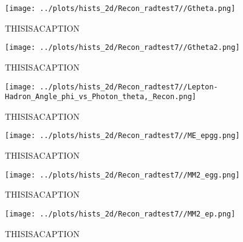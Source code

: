 \documentclass{article}
\begin{document}
\begin{landscape}
    \begin{figure}[ht]
        \centering

        \texttt{[image: ../plots/hists\_2d/Recon\_radtest7//Gtheta.png]}
        \captionsetup{textformat=empty,labelformat=blank}
        \caption{THISISACAPTION}
    \end{figure}
    \clearpage
    
    \begin{figure}[ht]
        \centering

        \texttt{[image: ../plots/hists\_2d/Recon\_radtest7//Gtheta2.png]}
        \captionsetup{textformat=empty,labelformat=blank}
        \caption{THISISACAPTION}
    \end{figure}
    \clearpage
    
    \begin{figure}[ht]
        \centering

        \texttt{[image: ../plots/hists\_2d/Recon\_radtest7//Lepton-Hadron\_Angle\_phi\_vs\_Photon\_theta,\_Recon.png]}
        \captionsetup{textformat=empty,labelformat=blank}
        \caption{THISISACAPTION}
    \end{figure}
    \clearpage
    
    \begin{figure}[ht]
        \centering

        \texttt{[image: ../plots/hists\_2d/Recon\_radtest7//ME\_epgg.png]}
        \captionsetup{textformat=empty,labelformat=blank}
        \caption{THISISACAPTION}
    \end{figure}
    \clearpage
    
    \begin{figure}[ht]
        \centering

        \texttt{[image: ../plots/hists\_2d/Recon\_radtest7//MM2\_egg.png]}
        \captionsetup{textformat=empty,labelformat=blank}
        \caption{THISISACAPTION}
    \end{figure}
    \clearpage
    
    \begin{figure}[ht]
        \centering

        \texttt{[image: ../plots/hists\_2d/Recon\_radtest7//MM2\_ep.png]}
        \captionsetup{textformat=empty,labelformat=blank}
        \caption{THISISACAPTION}
    \end{figure}
    \clearpage
    
    \begin{figure}[ht]
        \centering


\end{figure}
\end{landscape}
\end{document}
